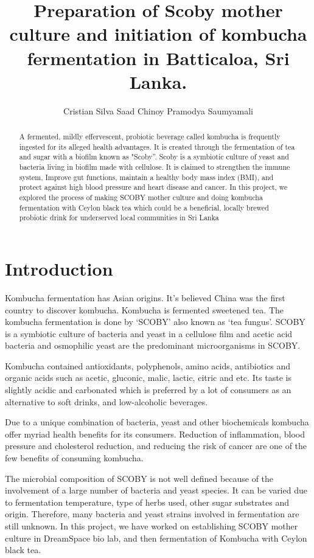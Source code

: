 \documentclass[12pt]{article}
\title{Preparation of Scoby mother culture and initiation of kombucha fermentation in Batticaloa, Sri Lanka.}
\author{Cristian Silva\inst{1} Saad Chinoy\inst{1} Pramodya Saumyamali \inst{2}}
\begin{document}
 
	
	\maketitle
	
	\begin{abstract}
	    A fermented, mildly effervescent, probiotic beverage called kombucha is frequently ingested for its alleged health advantages. It is created through the fermentation of tea and sugar with a biofilm known as "Scoby”. Scoby is a symbiotic culture of yeast and bacteria living in biofilm made with cellulose. It is claimed to strengthen the immune system, Improve gut functions, maintain a healthy body mass index (BMI), and protect against high blood pressure and heart disease and cancer. In this project, we explored the process of making SCOBY mother culture and doing kombucha fermentation with Ceylon black tea which could be a beneficial,  locally brewed probiotic  drink for underserved local communities in Sri Lanka

	\end{abstract}
	    
		
	
	
	\section{Introduction}
	\label{sec:introduction}
	Kombucha fermentation has Asian origins. It's believed China was the first country to discover kombucha. Kombucha is fermented sweetened tea. The kombucha fermentation is done by ‘SCOBY’ also known as ‘tea fungus’.  SCOBY is a symbiotic culture of bacteria and yeast in a cellulose film and acetic acid bacteria and osmophilic yeast are the predominant microorganisms in SCOBY. 

Kombucha contained antioxidants, polyphenols, amino acids, antibiotics and organic acids such as acetic, gluconic, malic, lactic, citric and etc. Its taste is slightly acidic and carbonated which is preferred by a lot of consumers as an alternative to soft drinks, and low-alcoholic beverages. 

Due to a unique combination of bacteria, yeast and other biochemicals kombucha offer myriad health benefits for its consumers. Reduction of inflammation, blood pressure and cholesterol reduction, and reducing the risk of cancer are one of the few benefits of consuming kombucha. 

The microbial composition of SCOBY is not well defined because of the involvement of a large number of bacteria and yeast species. It can be varied due to fermentation temperature, type of herbs used, other sugar substrates and origin. Therefore, many bacteria and yeast strains involved in fermentation are still unknown.  
In this project, we have worked on establishing SCOBY mother culture in DreamSpace bio lab, and then fermentation of Kombucha with Ceylon black tea. 
\end{document}
